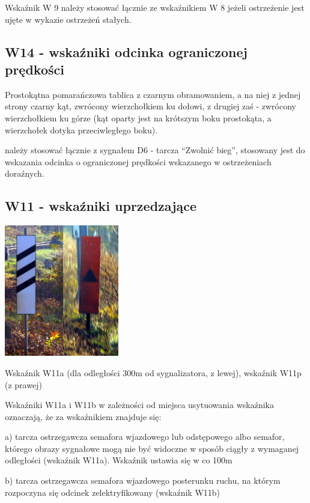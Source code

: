 Wskaźnik W 9 należy stosować łącznie ze wskaźnikiem W 8 jeżeli ostrzeżenie jest ujęte w wykazie ostrzeżeń stałych. 

\subsection{W14 - wskaźniki odcinka ograniczonej prędkości}

Prostokątna pomarańczowa tablica z czarnym obramowaniem, a na niej z jednej strony czarny kąt, zwrócony wierzchołkiem ku dołowi, z drugiej zaś - zwrócony wierzchołkiem ku górze (kąt oparty jest na krótszym boku prostokąta, a wierzchołek dotyka przeciwległego boku). 
\begin{tcolorbox}[colback=black!5!white,colframe=white!55!black,title=Wskaźnik W14] należy stosować łącznie z sygnałem D6 - tarcza “Zwolnić bieg”, stosowany jest do wskazania odcinka o ograniczonej prędkości wskazanego w ostrzeżeniach doraźnych. \end{tcolorbox}

\subsection{W11 - wskaźniki uprzedzające}
	\begin{marginfigure}
	\includegraphics[width=5cm]{skryptkierownik-img/wskazniki-w11.jpg}
	\caption{Wskaźnik W11a (dla odległości 300m od sygnalizatora, z lewej), wskaźnik W11p (z prawej)} 
\end{marginfigure}
Wskaźniki W11a i W11b w zależności od miejsca usytuowania wskaźnika oznaczają, że za wskaźnikiem znajduje się:

a) tarcza ostrzegawcza semafora wjazdowego lub odstępowego albo semafor, którego obrazy sygnałowe mogą nie być widoczne w sposób ciągły z wymaganej odległości (wskaźnik W11a). Wskaźnik ustawia się w co 100m

b) tarcza ostrzegawcza semafora wjazdowego posterunku ruchu, na którym rozpoczyna się odcinek zelektryfikowany (wskaźnik W11b)

